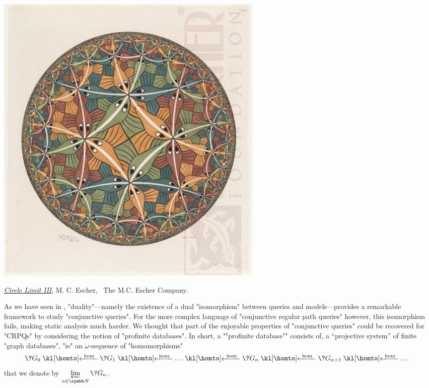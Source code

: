 \begin{marginfigure}
	\centering
	\includegraphics[width=\linewidth]{fig/escher/CL3.jpg}
	\caption{\href{https://mcescher.com/gallery/symmetry/\#iLightbox[gallery\_image_1]/12}{\emph{Circle Limit III}}, M. C. Escher, \textcopyright~The M.C. Escher Company.}
\end{marginfigure}
As we have seen in , "duality"---namely the existence of
a dual "isomorphism" between queries and models---provides a remarkable framework to
study "conjunctive queries". For the more complex language of "conjunctive regular path queries"
however, this isomorphism fails, making static analysis much harder.
We thought that part of the enjoyable properties of "conjunctive queries"
could be recovered for "CRPQs" by considering the notion of "profinite databases".
In short, a \AP""profinite database"" consists of, a ``projective system'' of finite "graph databases",
"ie" an $\omega$-sequence of "homomorphisms"
\[
	\?G_0 \cohomto \?G_1 \cohomto \dotsc \cohomto \?G_n \cohomto \?G_{n+1} \cohomto \dotsc
\]
that we denote by $\varprojlim\limits_{n\in\N} \?G_n$.

\smallskip

